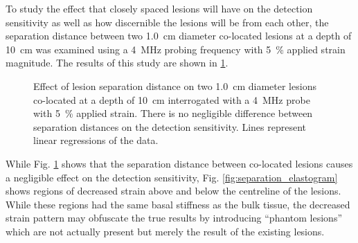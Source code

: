 			To study the effect that closely spaced lesions will have on the detection sensitivity as well as how discernible the lesions will be from each other, the separation distance between two \SI{1.0}{\cm} diameter co-located lesions at a depth of \SI{10}{\cm} was examined using a \SI{4}{\MHz} probing frequency with \SI{5}{\percent} applied strain magnitude. The results of this study are shown in \ref{fig:separation_characterization}.

			\begin{figure}[!htb]
				\centering
				\caption[Quasi-static lesion separation distance characterization]{Effect of lesion separation distance on two \SI{1.0}{\cm} diameter lesions co-located at a depth of \SI{10}{\cm} interrogated with a \SI{4}{\MHz} probe with \SI{5}{\percent} applied strain. There is no negligible difference between separation distances on the detection sensitivity. Lines represent linear regressions of the data.}
				\label{fig:separation_characterization}
			\end{figure}

			While Fig. \ref{fig:separation_characterization} shows that the separation distance between co-located lesions causes a negligible effect on the detection sensitivity, Fig. \ref{fig:separation_elastogram} shows regions of decreased strain above and below the centreline of the lesions. While these regions had the same basal stiffness as the bulk tissue, the decreased strain pattern may obfuscate the true results by introducing ``phantom lesions'' which are not actually present but merely the result of the existing lesions.

